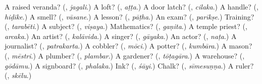 \begin{tcolorbox}[breakable,colback=teal!4,colframe=teal!35!black,title={Before you move on}]
A raised veranda? (\textbf{}, \emph{jagali}.) A loft? (\textbf{}, \emph{aṭṭa}.) A door latch? (\textbf{}, \emph{cilaka}.) A handle? (\textbf{}, \emph{hiḍike}.) A smell? (\textbf{}, \emph{vāsane}.) A lesson? (\textbf{}, \emph{pāṭha}.) An exam? (\textbf{}, \emph{parīkṣe}.) Training? (\textbf{}, \emph{tarabēti}.) A subject? (\textbf{}, \emph{viṣaya}.) Mathematics? (\textbf{}, \emph{gaṇita}.) A temple priest? (\textbf{}, \emph{arcaka}.) An artist? (\textbf{}, \emph{kalāvida}.) A singer? (\textbf{}, \emph{gāyaka}.) An actor? (\textbf{}, \emph{naṭa}.) A journalist? (\textbf{}, \emph{patrakarta}.) A cobbler? (\textbf{}, \emph{mōci}.) A potter? (\textbf{}, \emph{kumbāra}.) A mason? (\textbf{}, \emph{mēstri}.) A plumber? (\textbf{}, \emph{plambar}.) A gardener? (\textbf{}, \emph{tōṭagāra}.) A warehouse? (\textbf{}, \emph{gōdāmu}.) A signboard? (\textbf{}, \emph{phalaka}.) Ink? (\textbf{}, \emph{śāyi}.) Chalk? (\textbf{}, \emph{sīmesuṇṇa}.) A ruler? (\textbf{}, \emph{skēlu}.)
\end{tcolorbox}

